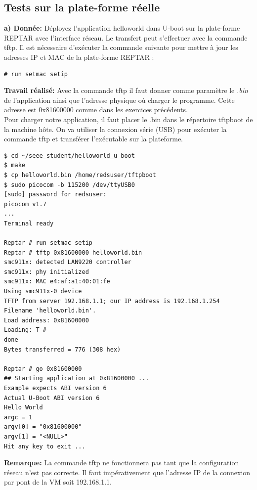\subsection{Tests sur la plate-forme réelle}
\textbf{a) Donnée: }Déployez l'application helloworld dans U-boot sur la plate-forme REPTAR avec l'interface réseau.
Le transfert peut s'effectuer avec la commande tftp.
Il est nécessaire d’exécuter la commande suivante pour mettre à jour les adresses IP et MAC de la plate-forme
REPTAR : 
\begin{lstlisting}
# run setmac setip 
\end{lstlisting}
\textbf{Travail réalisé: }Avec la commande tftp il faut donner comme paramètre le \textit{.bin} de l'application ainsi que l'adresse physique où charger le programme. Cette adresse est 0x81600000 comme dans les exercices précédents.\\
Pour charger notre application, il faut placer le .bin dans le répertoire tftpboot de la machine hôte. On va utiliser la connexion série (USB) pour exécuter la commande tftp et transférer l'exécutable sur la plateforme.
\begin{lstlisting}
$ cd ~/seee_student/helloworld_u-boot
$ make
$ cp helloworld.bin /home/redsuser/tftpboot
$ sudo picocom -b 115200 /dev/ttyUSB0 
[sudo] password for redsuser: 
picocom v1.7
...
Terminal ready

Reptar # run setmac setip
Reptar # tftp 0x81600000 helloworld.bin
smc911x: detected LAN9220 controller
smc911x: phy initialized
smc911x: MAC e4:af:a1:40:01:fe
Using smc911x-0 device
TFTP from server 192.168.1.1; our IP address is 192.168.1.254
Filename 'helloworld.bin'.
Load address: 0x81600000
Loading: T #
done
Bytes transferred = 776 (308 hex)

Reptar # go 0x81600000
## Starting application at 0x81600000 ...
Example expects ABI version 6
Actual U-Boot ABI version 6
Hello World
argc = 1
argv[0] = "0x81600000"
argv[1] = "<NULL>"
Hit any key to exit ... 
\end{lstlisting}
\textbf{Remarque: }La commande tftp ne fonctionnera pas tant que la configuration réseau n'est pas correcte. Il faut impérativement que l'adresse IP de la connexion par pont de la VM soit 192.168.1.1.
